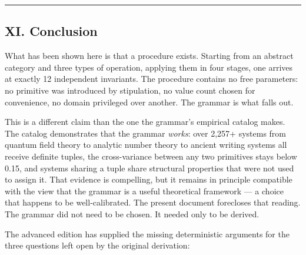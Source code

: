 \documentclass[12pt,a4paper]{article}
\begin{document}
\begin{center}
\rule{0.5\textwidth}{0.4pt}
\end{center}

\subsection{XI. Conclusion}

What has been shown here is that a procedure exists. Starting from an abstract category and three types of operation, applying them in four stages, one arrives at exactly 12 independent invariants. The procedure contains no free parameters: no primitive was introduced by stipulation, no value count chosen for convenience, no domain privileged over another. The grammar is what falls out.

This is a different claim than the one the grammar's empirical catalog makes. The catalog demonstrates that the grammar \emph{works}: over 2,257+ systems from quantum field theory to analytic number theory to ancient writing systems all receive definite tuples, the cross-variance between any two primitives stays below 0.15, and systems sharing a tuple share structural properties that were not used to assign it. That evidence is compelling, but it remains in principle compatible with the view that the grammar is a useful theoretical framework --- a choice that happens to be well-calibrated. The present document forecloses that reading. The grammar did not need to be chosen. It needed only to be derived.

The advanced edition has supplied the missing deterministic arguments for the three questions left open by the original derivation:
\end{document}
